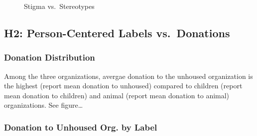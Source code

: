 \documentclass[
  man,
  floatsintext,
  longtable,
  nolmodern,
  notxfonts,
  notimes,
  colorlinks=true,linkcolor=blue,citecolor=blue,urlcolor=blue]{apa7}
\begin{document}
\begin{figure}

\caption{\label{fig-correlation-stigma-stereotype}Stigma
vs.~Stereotypes}


\end{figure}%

\subsection{H2: Person-Centered Labels
vs.~Donations}\label{h2-person-centered-labels-vs.-donations}

\subsubsection{Donation Distribution}\label{donation-distribution}

Among the three organizations, avergae donation to the unhoused
organization is the highest (report mean donation to unhoused) compared
to children (report mean donation to children) and animal (report mean
donation to animal) organizations. See figure\ldots{}

\subsubsection{Donation to Unhoused Org. by
Label}\label{donation-to-unhoused-org.-by-label}
\end{document}
